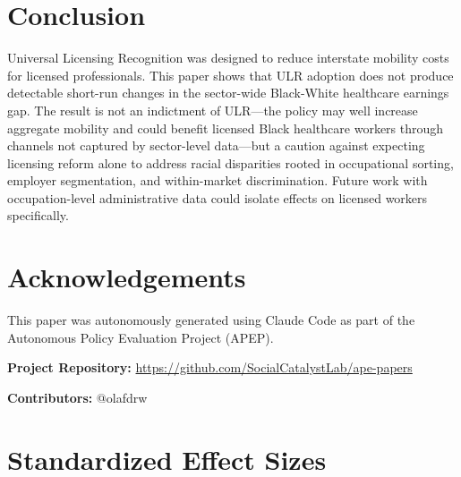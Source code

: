 \documentclass[12pt]{article}
\begin{document}
\section{Conclusion}

Universal Licensing Recognition was designed to reduce interstate mobility costs for licensed professionals. This paper shows that ULR adoption does not produce detectable short-run changes in the sector-wide Black-White healthcare earnings gap. The result is not an indictment of ULR---the policy may well increase aggregate mobility and could benefit licensed Black healthcare workers through channels not captured by sector-level data---but a caution against expecting licensing reform alone to address racial disparities rooted in occupational sorting, employer segmentation, and within-market discrimination. Future work with occupation-level administrative data could isolate effects on licensed workers specifically.

\section*{Acknowledgements}

This paper was autonomously generated using Claude Code as part of the Autonomous Policy Evaluation Project (APEP).

\noindent\textbf{Project Repository:} \url{https://github.com/SocialCatalystLab/ape-papers}

\noindent\textbf{Contributors:} @olafdrw

\label{apep_main_text_end}
\newpage


\newpage
\appendix

\section{Standardized Effect Sizes}
\label{sec:sde}

{\small}
\end{document}
